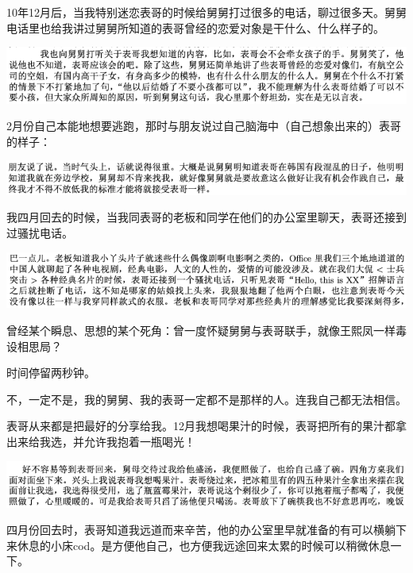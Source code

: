 \documentclass[9pt, b5paper]{article}
\begin{document}
10年12月后，当我特别迷恋表哥的时候给舅舅打过很多的电话，聊过很多天。舅舅电话里也给我讲过舅舅所知道的表哥曾经的恋爱对象是干什么、什么样子的。 

\begin{center}
\includegraphics[width=.9\linewidth]{./pic/p1p45-1.png}
\end{center}

2月份自己本能地想要逃跑，那时与朋友说过自己脑海中（自己想象出来的）表哥的样子：

\begin{center}
\includegraphics[width=.9\linewidth]{./pic/p1p49-1.png}
\end{center}

我四月回去的时候，当我同表哥的老板和同学在他们的办公室里聊天，表哥还接到过骚扰电话。

\begin{center}
\includegraphics[width=.9\linewidth]{./pic/p1p57-1.png}
\end{center}

曾经某个瞬息、思想的某个死角：曾一度怀疑舅舅与表哥联手，就像王熙凤一样毒设相思局？

时间停留两秒钟。

不，一定不是，我的舅舅、我的表哥一定都不是那样的人。连我自己都无法相信。 

表哥从来都是把最好的分享给我。12月我想喝果汁的时候，表哥把所有的果汁都拿出来给我选，并允许我抱着一瓶喝光！

\begin{center}
\includegraphics[width=.9\linewidth]{./pic/p1p42-2.png}
\end{center}

四月份回去时，表哥知道我远道而来辛苦，他的办公室里早就准备的有可以横躺下来休息的小床cod。是方便他自己，也方便我远途回来太累的时候可以稍微休息一下。 
\end{document}
